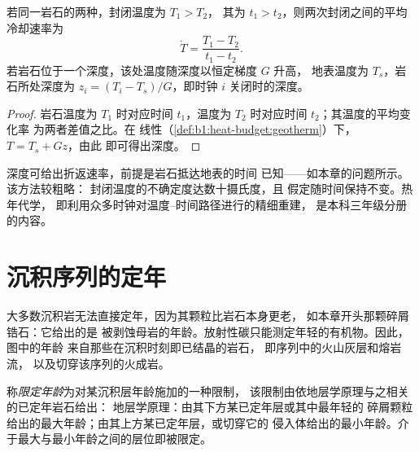 \begin{proposition}[两次封闭之间的冷却速率]\label{prop:b1:radiometric-methods:cooling}
若同一岩石的两种，封闭温度为 $T_1 > T_2$，
其为 $t_1 > t_2$，则两次封闭之间的平均冷却速率为
\[
  \dot T = \frac{T_1 - T_2}{t_1 - t_2}.
\]
若岩石位于一个深度，该处温度随深度以恒定梯度 $G$ 升高，
地表温度为 $T_s$，岩石所处深度为 $z_i
= (T_i - T_s)/G$，即时钟 $i$ 关闭时的深度。
\end{proposition}

\begin{proof}
岩石温度为 $T_1$ 时对应时间 $t_1$，温度为 $T_2$ 时对应时间 $t_2$；其温度的平均变化率
为两者差值之比。在
线性（\cref{def:b1:heat-budget:geotherm}）下，$T = T_s + G z$，由此
即可得出深度。
\end{proof}

深度可给出折返速率，前提是岩石抵达地表的时间
已知——如本章的问题所示。该方法较粗略：
封闭温度的不确定度达数十摄氏度，且
假定随时间保持不变。热年代学，
即利用众多时钟对温度–时间路径进行的精细重建，
是本科三年级分册的内容。

\section{沉积序列的定年}\label{sec:b1:radiometric-methods:sediments}

大多数沉积岩无法直接定年，因为其颗粒比岩石本身更老，
如本章开头那颗碎屑锆石：它给出的是
被剥蚀母岩的年龄。放射性碳只能测定年轻的有机物。因此，图中的年龄
来自那些在沉积时刻即已结晶的岩石，
即序列中的火山灰层和熔岩流，
以及切穿该序列的火成岩。

\begin{definition}[限定年龄]\label{def:b1:radiometric-methods:bracketing}
称\emph{限定年龄}为对某沉积层年龄施加的一种限制，
该限制由依地层学原理与之相关的已定年岩石给出：
地层学原理：由其下方某已定年层或其中最年轻的
碎屑颗粒给出的最大年龄；由其上方某已定年层，或切穿它的
侵入体给出的最小年龄。介于最大与最小年龄之间的层位即被限定。
\end{definition}

